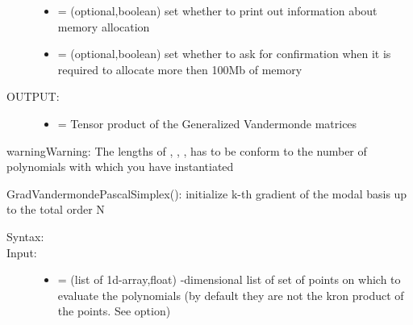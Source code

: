 \documentclass[letterpaper,10pt,english]{sphinxmanual}
\begin{document}
\begin{fulllineitems}
\begin{fulllineitems}
\begin{description}
\begin{itemize}
\item {} 
 = (optional,boolean) set whether to print out information about memory allocation

\item {} 
 = (optional,boolean) set whether to ask for confirmation when it is required to allocate more then 100Mb of memory

\end{itemize}

\item[{OUTPUT:}] \leavevmode\begin{itemize}
\item {} 
 = Tensor product of the Generalized Vandermonde matrices

\end{itemize}

\end{description}

\begin{notice}{warning}{Warning:}
The lengths of  ,  ,  ,  has to be conform to the number of polynomials with which you have instantiated 
\end{notice}

\end{fulllineitems}


\begin{fulllineitems}
\label{index:SpectralToolbox.SpectralND.PolyND.GradVandermondePascalSimplex}
GradVandermondePascalSimplex(): initialize k-th gradient of the modal basis up to the total order N
\begin{description}
\item[{Syntax:}] \leavevmode
{}

\item[{Input:}] \leavevmode\begin{itemize}
\item {} 
 = (list of 1d-array,float) -dimensional list of set of points on which to evaluate the polynomials (by default they are not the kron product of the points. See  option)


\end{itemize}
\end{description}
\end{fulllineitems}
\end{fulllineitems}
\end{document}
